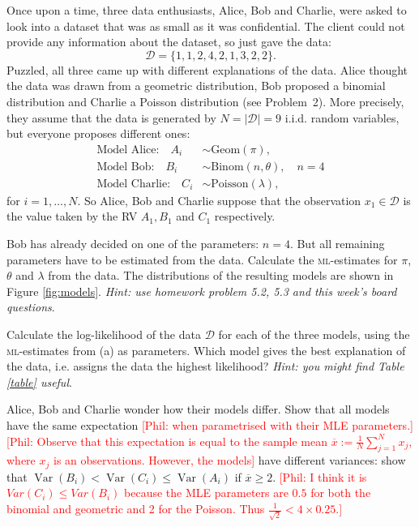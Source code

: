 \documentclass[a4paper,10pt,landscape,twocolumn]{scrartcl}
\DeclareMathOperator{\Var}{Var}
\newcommand{\philip}[1]{\textcolor{red}{[Phil: #1]}}
\begin{document}
\begin{exercise}
Once upon a time, three data enthusiasts, Alice, Bob and Charlie, were asked to look into a dataset that was as small as it was confidential. The client could not provide any information about the dataset, so just gave the data:
	\[
		\mathcal{D} = \{ 1, 1, 2, 4, 2, 1, 3, 2, 2 \}.
	\]
	Puzzled, all three came up with different explanations of the data. Alice thought the data was drawn from a geometric distribution, Bob proposed a binomial distribution and Charlie a Poisson distribution (see Problem~2). More precisely, they assume that the data is generated by $N = |\mathcal D|=9$ i.i.d. random variables, but everyone proposes different ones:
	\begin{align}
		\text{Model Alice:} \quad A_i &\sim \text{Geom}(\pi),\\
		\text{Model Bob:} \quad B_i &\sim \text{Binom}(n, \theta), \quad n=4\\
		\text{Model Charlie:} \quad C_i &\sim \text{Poisson}(\lambda),
	\end{align}
	for $i = 1, \dots, N$. So Alice, Bob and Charlie suppose that the observation $x_1 \in \mathcal D$ is the value taken by the RV $A_1, B_1$ and $C_1$ respectively.
	
	\begin{subex}[0.5pt]
	Bob has already decided on one of the parameters: $n=4$. But all remaining parameters have to be estimated from the data. Calculate the \textsc{ml}-estimates for $\pi$, $\theta$ and $\lambda$ from the data. The distributions of the resulting models are shown in Figure \ref{fig:models}. 
	\emph{Hint: use homework problem 5.2, 5.3 and this week's board questions}.
	\end{subex}
	
	\begin{subex}[0.5pt]
		Calculate the log-likelihood of the data $\mathcal D$ for each of the three models, using the \textsc{ml}-estimates from (a) as parameters. Which model gives the best explanation of the data, i.e. assigns the data the highest likelihood? \emph{Hint: you might find Table \ref{table} useful}.
	\end{subex}
	
	\begin{subex}[1pt]
		Alice, Bob and Charlie wonder how their models differ. Show that all models have the same expectation \philip{when parametrised with their MLE parameters.} \philip{Observe that this expectation is equal to the sample mean $\overline x := \frac{1}{N} \sum_{j=1}^N x_j$, where $x_j$ is an observations. However, the models} have different variances: show that $\Var(B_i) < \Var(C_i) \le \Var(A_i)$ if $\overline x \ge 2$. \philip{I think it is $ Var(C_{i}) \leq Var(B_{i}) $ because
		the MLE parameters are $ 0.5 $ for both the binomial and geometric and 2 for the Poisson. Thus $ \frac{1}{\sqrt{2}} < 4\times 0.25 $.}
	\end{subex}
	

\end{exercise}
\end{document}
